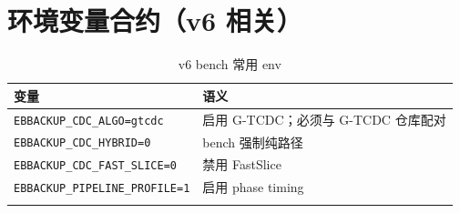 \section{环境变量合约（v6 相关）}

\begin{longtable}{@{}p{4.5cm}p{9.5cm}@{}}
\toprule
\textbf{变量} & \textbf{语义} \\
\midrule
\endhead
\texttt{EBBACKUP\_CDC\_ALGO=gtcdc} & 启用 G-TCDC；必须与 G-TCDC 仓库配对 \\
\texttt{EBBACKUP\_CDC\_HYBRID=0} & bench 强制纯路径 \\
\texttt{EBBACKUP\_CDC\_FAST\_SLICE=0} & 禁用 FastSlice \\
\texttt{EBBACKUP\_PIPELINE\_PROFILE=1} & 启用 phase timing \\
\bottomrule
\caption{v6 bench 常用 env}
\end{longtable}
